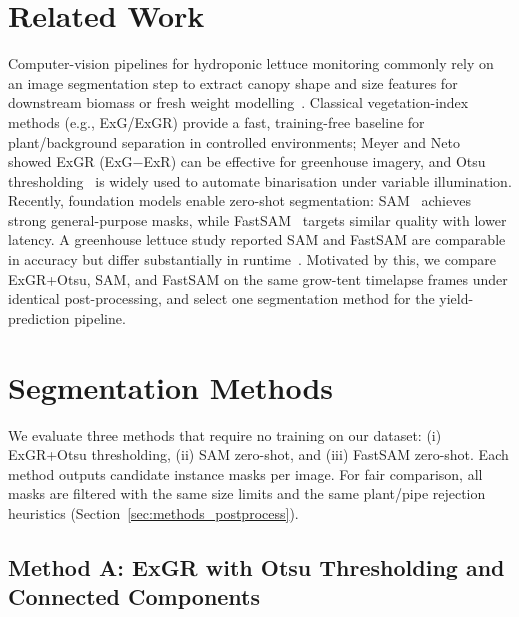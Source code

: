 
\section{Related Work}
\label{sec:related}

\noindent
Computer-vision pipelines for hydroponic lettuce monitoring commonly rely on an image
segmentation step to extract canopy shape and size features for downstream biomass or fresh
weight modelling~\cite{gao2022}. Classical vegetation-index methods (e.g., ExG/ExGR) provide a
fast, training-free baseline for plant/background separation in controlled environments; Meyer
and Neto~\cite{meyer2008} showed ExGR (ExG$-$ExR) can be effective for greenhouse imagery, and
Otsu thresholding~\cite{otsu1979} is widely used to automate binarisation under variable
illumination. Recently, foundation models enable zero-shot segmentation: SAM~\cite{kirillov2023}
achieves strong general-purpose masks, while FastSAM~\cite{zhao2023fastsam} targets similar
quality with lower latency. A greenhouse lettuce study reported SAM and FastSAM are comparable
in accuracy but differ substantially in runtime~\cite{cornell2024}. Motivated by this, we
compare ExGR+Otsu, SAM, and FastSAM on the same grow-tent timelapse frames under identical
post-processing, and select one segmentation method for the yield-prediction pipeline.


\section{Segmentation Methods}
\label{sec:methods}

We evaluate three methods that require no training on our dataset: (i) ExGR+Otsu thresholding,
(ii) SAM zero-shot, and (iii) FastSAM zero-shot. Each method outputs candidate instance masks
per image. For fair comparison, all masks are filtered with the same size limits and the same
plant/pipe rejection heuristics (Section~\ref{sec:methods_postprocess}).

\subsection{Method A: ExGR with Otsu Thresholding and Connected Components}
\label{sec:methods_exgr}

